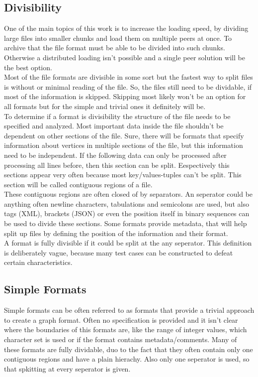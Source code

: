 \subsection{Divisibility}
One of the main topics of this work is to increase the loading speed, by dividing large files into smaller chunks and load them on multiple peers at once. To archive that the file format must be able to be divided into such chunks. Otherwise a distributed loading isn’t possible and a single peer solution will be the best option.\\
Most of the file formats are divisible in some sort but the fastest way to split files is without or minimal reading of the file. So, the files still need to be dividable, if most of the information is skipped. Skipping most likely won’t be an option for all formats but for the simple and trivial ones it definitely will be.\\
To determine if a format is divisibility the structure of the file needs to be specified and analyzed. Most important data inside the file shouldn’t be dependent on other sections of the file. Sure, there will be formats that specify information about vertices in multiple sections of the file, but this information need to be independent. If the following data can only be processed after processing all lines before, then this section can be split. Eespectively this sections appear very often because most  key/values-tuples can’t be split. This section will be called contiguous regions of a file.\\
These contiguous regions are often closed of by separators. An seperator could be anything often newline characters, tabulations and  semicolons are used, but also tags (XML), brackets (JSON) or even the position itself in binary sequences can be used to divide these sections. Some formats provide metadata, that will help split up files by defining the position of the information and their format.\\
A format is fully divisible if it could be split at the any seperator. This definition is deliberately vague, because many test cases can be constructed to defeat certain characteristics.

\subsection{Simple Formats}
Simple formats can be often referred to as formats that provide a trivial approach to create a graph format. Often no specification is provided and it isn’t clear where the boundaries of this formats are, like the range of integer values, which character set is used or if the format contains metadata/comments. Many of these formats are fully dividable, duo to the fact that they often contain only one contiguous regions and have a plain hierachy. Also only one seperator is used, so that spkitting at every seperator is given.\cite{Roughan.10.03.2015}

